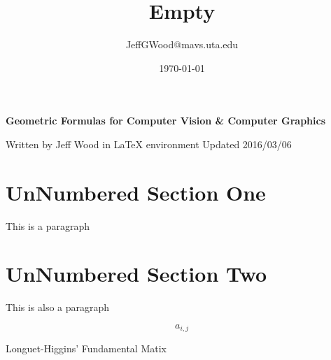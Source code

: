 \documentclass[a4paper,10pt]{article}
\title{Empty}
\author{JeffGWood@mavs.uta.edu}
\date{\today}
\newcommand{\cAij}[2]{\ensuremath{a_{{#1},{#2}}}}
\begin{document}
\maketitle
\newpage
\tableofcontents
\newpage
\Huge\center\textbf{Geometric Formulas for \newline Computer Vision \& \newline Computer Graphics}\newline

\large Written by Jeff Wood in LaTeX environment\newline
\large Updated 2016/03/06 \newline

\normalsize
\flushleft

\section*{UnNumbered Section One}
This is a paragraph
\section*{UnNumbered Section Two}
This is also a paragraph

\begin{equation*}
\cAij{i}{j}
\end{equation*}

Longuet-Higgins' Fundamental Matix ~\cite{Longuet-Higgins}

{}

\end{document}
